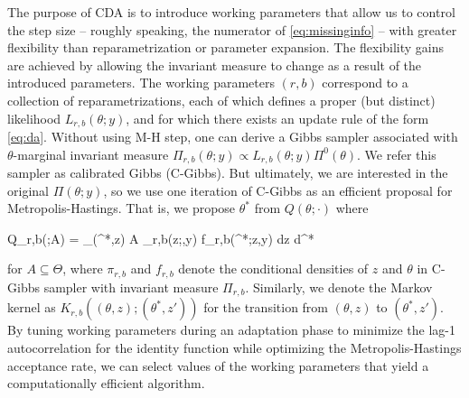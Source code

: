 \documentclass[10pt]{article}
\newcommand{\be}{\begin{equs}}
\newcommand{\ee}{\end{equs}}
\newcommand{\mc}[1]{\mathcal{#1}}
\begin{document}
The purpose of CDA is to introduce working parameters that allow us to control the step size -- roughly speaking, the numerator of \eqref{eq:missinginfo} -- with greater flexibility than reparametrization or parameter expansion. The flexibility gains are achieved by allowing the invariant measure to change as a result of the introduced parameters. The working parameters $(r,b)$ correspond to a collection of reparametrizations, each of which defines a proper (but distinct) likelihood $L_{r,b}(\theta;y)$, and for which there exists an update rule of the form \eqref{eq:da}. Without using M-H step, one can derive a Gibbs sampler associated with $\theta$-marginal invariant measure $\Pi_{r,b}(\theta;y) \propto L_{r,b}(\theta;y) \Pi^0(\theta)$. We refer this sampler as calibrated Gibbs (C-Gibbs). But ultimately, we are interested in the original $\Pi(\theta;y)$, so we use one iteration of C-Gibbs as an efficient proposal for Metropolis-Hastings. That is, we propose $\theta^*$ from $Q(\theta;\cdot)$ where
\be \label{eq:Q}
Q_{r,b}(\theta;A) = \int_{(\theta^*,z) \in A \times \mc Z} \pi_{r,b}(z;\theta,y) f_{r,b}(\theta^*;z,y) dz d\theta^*
\ee
for $A \subseteq \Theta$, where $\pi_{r,b}$ and $f_{r,b}$ denote the conditional densities of $z$ and $\theta$ in C-Gibbs sampler with invariant measure $\Pi_{r,b}$. Similarly, we denote the Markov kernel as $K_{r,b}((\theta,z);(\theta^*,z'))$ for the transition from $(\theta,z)$ to $(\theta^*,z')$. By tuning working parameters during an adaptation phase to minimize the lag-1 autocorrelation for the identity function while optimizing the Metropolis-Hastings acceptance rate, we can select values of the working parameters that yield a computationally efficient algorithm.
\end{document}

